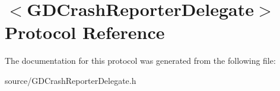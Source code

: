 \hypertarget{protocol_g_d_crash_reporter_delegate-p}{
\section{$<$GDCrashReporterDelegate$>$ Protocol Reference}
\label{protocol_g_d_crash_reporter_delegate-p}
}


The documentation for this protocol was generated from the following file:\begin{DoxyCompactItemize}
\item 
source/GDCrashReporterDelegate.h\end{DoxyCompactItemize}
